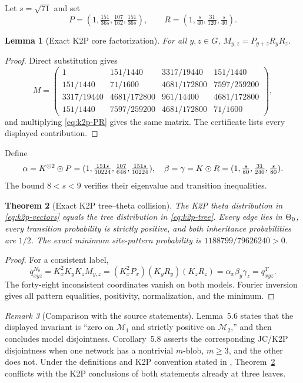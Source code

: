 \documentclass[11pt]{article}
\newtheorem{theorem}{Theorem}\newtheorem{proposition}[theorem]{Proposition}\newtheorem{lemma}[theorem]{Lemma}\newtheorem{corollary}[theorem]{Corollary}
\theoremstyle{remark}\newtheorem{remark}[theorem]{Remark}
\begin{document}
Let $s=\sqrt{71}$ and set
\begin{equation}\label{eq:k2p-PR}P=(1,\tfrac{151}{36s},\tfrac{107}{162},\tfrac{151}{36s}),\qquad R=(1,\tfrac{s}{40},\tfrac{31}{120},\tfrac{s}{40}).\end{equation}
\begin{lemma}[Exact K2P core factorization]\label{lem:k2p-factor}
For all $y,z\in G$, $M_{y,z}=P_{y+z}R_yR_z$.
\end{lemma}
\begin{proof}
Direct substitution gives
\[
M=\begin{pmatrix}
1&151/1440&3317/19440&151/1440\\
151/1440&71/1600&4681/172800&7597/259200\\
3317/19440&4681/172800&961/14400&4681/172800\\
151/1440&7597/259200&4681/172800&71/1600
\end{pmatrix},
\]
and multiplying \eqref{eq:k2p-PR} gives the same matrix. The certificate lists every displayed contribution.
\end{proof}
Define
\begin{equation}\label{eq:k2p-tree}
\alpha=K^{\mathbin{\odot}2}\mathbin{\odot} P=(1,\tfrac{151s}{10224},\tfrac{107}{648},\tfrac{151s}{10224}),\quad
\beta=\gamma=K\mathbin{\odot} R=(1,\tfrac{s}{80},\tfrac{31}{240},\tfrac{s}{80}).
\end{equation}
The bound $8<s<9$ verifies their eigenvalue and transition inequalities.
\begin{theorem}[Exact K2P tree--theta collision]\label{thm:k2p}
The K2P theta distribution in \eqref{eq:k2p-vectors} equals the tree distribution in \eqref{eq:k2p-tree}. Every edge lies in $\Theta_0$, every transition probability is strictly positive, and both inheritance probabilities are $1/2$. The exact minimum site-pattern probability is $1188799/79626240>0$.
\end{theorem}
\begin{proof}
For a consistent label,
\[
q^{N_\theta}_{xyz}=K_x^2K_yK_zM_{y,z}=(K_x^2P_x)(K_yR_y)(K_zR_z)=\alpha_x\beta_y\gamma_z=q^T_{xyz}.
\]
The forty-eight inconsistent coordinates vanish on both models. Fourier inversion gives all pattern equalities, positivity, normalization, and the minimum.
\end{proof}
\begin{remark}[Comparison with the source statements]\label{rem:source}
Lemma~5.6 states that the displayed invariant is ``zero on $\mathcal M_1$ and strictly positive on $\mathcal M_2$,'' and then concludes model disjointness. Corollary~5.8 asserts the corresponding JC/K2P disjointness when one network has a nontrivial $m$-blob, $m\ge3$, and the other does not. Under the definitions and K2P convention stated in \cite{BritsHoltgrefeVanIerselMartin2026}, Theorem~\ref{thm:k2p} conflicts with the K2P conclusions of both statements already at three leaves.
\end{remark}
\end{document}
